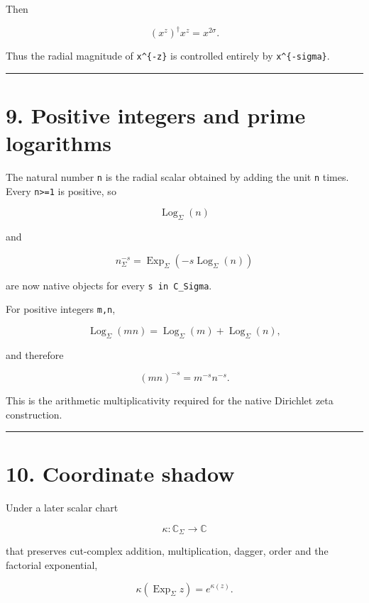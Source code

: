 Then

\[
(x^z)^\dagger x^z
=x^{2\sigma}.
\]

Thus the radial magnitude of \texttt{x\^{}\{-z\}} is controlled entirely by
\texttt{x\^{}\{-sigma\}}.

\begin{center}\rule{0.5\linewidth}{0.5pt}\end{center}

\hypertarget{positive-integers-and-prime-logarithms}{%
\section{9. Positive integers and prime logarithms}\label{positive-integers-and-prime-logarithms}}

The natural number \texttt{n} is the radial scalar obtained by adding the unit \texttt{n}
times. Every \texttt{n\textgreater{}=1} is positive, so

\[
\operatorname{Log}_\Sigma(n)
\]

and

\[
n^{-s}_\Sigma
=
\operatorname{Exp}_\Sigma
(-s\operatorname{Log}_\Sigma(n))
\]

are now native objects for every \texttt{s\ in\ C\_Sigma}.

For positive integers \texttt{m,n},

\[
\operatorname{Log}_\Sigma(mn)
=
\operatorname{Log}_\Sigma(m)
+
\operatorname{Log}_\Sigma(n),
\]

and therefore

\[
(mn)^{-s}=m^{-s}n^{-s}.
\]

This is the arithmetic multiplicativity required for the native Dirichlet zeta
construction.

\begin{center}\rule{0.5\linewidth}{0.5pt}\end{center}

\hypertarget{coordinate-shadow}{%
\section{10. Coordinate shadow}\label{coordinate-shadow}}

Under a later scalar chart

\[
\kappa:\mathbb C_\Sigma\to\mathbb C
\]

that preserves cut-complex addition, multiplication, dagger, order and the
factorial exponential,

\[
\kappa(\operatorname{Exp}_\Sigma z)=e^{\kappa(z)}.
\]

